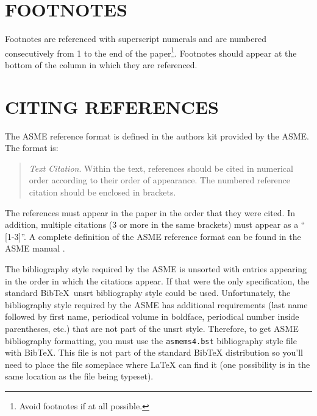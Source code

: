 \documentclass[twocolumn,10pt]{asme2e}
\begin{document}
\section*{FOOTNOTES\protect\footnotemark}

Footnotes are referenced with superscript numerals and are numbered consecutively from 1 to the end of the paper\footnote{Avoid footnotes if at all possible.}. Footnotes should appear at the bottom of the column in which they are referenced.


\section*{CITING REFERENCES}

The ASME reference format is defined in the authors kit provided by the ASME.  The format is:

\begin{quotation}
{\em Text Citation}. Within the text, references should be cited in  numerical order according to their order of appearance.  The numbered reference citation should be enclosed in brackets.
\end{quotation}

The references must appear in the paper in the order that they were cited.  In addition, multiple citations (3 or more in the same brackets) must appear as a `` [1-3]''.  A complete definition of the ASME reference format can be found in the  ASME manual \cite{asmemanual}.

The bibliography style required by the ASME is unsorted with entries appearing in the order in which the citations appear. If that were the only specification, the standard {\sc Bib}\TeX\ unsrt bibliography style could be used. Unfortunately, the bibliography style required by the ASME has additional requirements (last name followed by first name, periodical volume in boldface, periodical number inside parentheses, etc.) that are not part of the unsrt style. Therefore, to get ASME bibliography formatting, you must use the \verb+asmems4.bst+ bibliography style file with {\sc Bib}\TeX. This file is not part of the standard BibTeX distribution so you'll need to place the file someplace where LaTeX can find it (one possibility is in the same location as the file being typeset).
\end{document}
